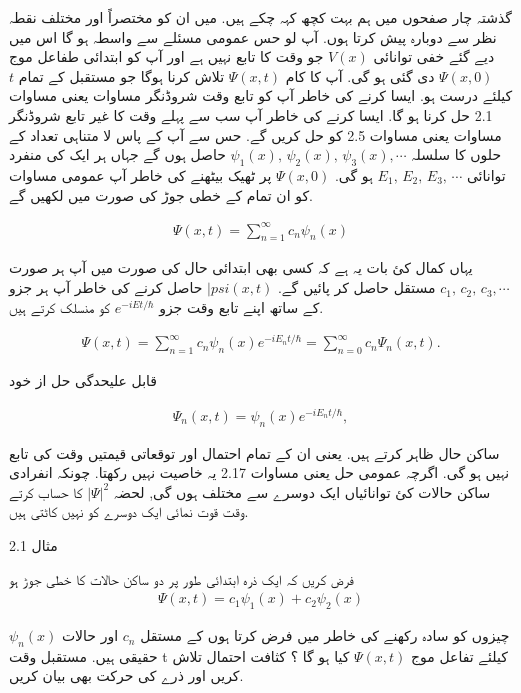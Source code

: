 گذشتہ چار صفحوں میں ہم بہت کچھ کہہ چکے ہیں. میں ان کو مختصراً اور مختلف نقطہ نظر سے دوبارہ پیش کرتا ہوں. آپ لو حس عمومی مسئلے سے واسطہ ہو گا اس میں دیے گئے خفی توانائی \( V(x) \) جو وقت کا تابع نہیں ہے اور آپ کو ابتدائی طفاعل موج \( \Psi (x,0) \) دی گئی ہو گی. آپ کا کام \( \Psi (x,t) \) تلاش کرنا ہوگا جو مستقبل کے تمام \( t \)  کیلئے درست ہو. ایسا کرنے کی خاطر آپ کو تابع وقت شروڈنگر مساوات یعنی مساوات 2.1 حل کرنا ہو گا. ایسا کرنے کی خاطر آپ سب سے پہلے وقت کا غیر تابع شروڈنگر مساوات یعنی مساوات 2.5 کو حل کریں گے. حس سے آپ کے پاس لا متناہی تعداد کے حلوں کا سلسلہ  \( \psi_{1}(x),\, \psi_{2}(x),\, \psi_{3}(x), \cdots \)  حاصل ہوں گے جہاں ہر ایک کی منفرد توانائی  \( E_{1}, \, E_{2}, \, E_{3}, \, \cdots \)  ہو گی. \( \Psi (x,0) \) پر ٹھیک بیٹھنے کی خاطر آپ عمومی مساوات کو ان تمام کے خطی جوڑ کی صورت میں لکھیں گے. 

\begin{align}
\Psi (x,t) = \sum_{n=1}^{\infty} c_{n} \psi_{n}(x)
\end{align}



یہاں کمال کئ بات یہ ہے کہ کسی بھی ابتدائی حال کی صورت میں آپ ہر صورت \( c_{1}, \,c_{2}, \,c_{3}, \cdots \) مستقل حاصل کر پائیں گے. \( |psi (x,t) \)  حاصل کرنے کی خاطر آپ ہر جزو کے ساتھ اپنے تابع وقت جزو \( e^{-iEt/\hbar} \) کو منسلک کرتے ہیں. 

\begin{align}
\Psi (x,t) = \sum_{n=1}^{\infty} c_{n} \psi_{n}(x)e^{-iE_{n}t/\hbar} = \sum_{n=0}^{\infty} c_{n} \Psi_{n} (x,t).
\end{align}

قابل علیحدگی حل از خود 

\begin{align}
\Psi_{n} (x,t) = \psi_{n}(x) e^{-iE_{n}t/\hbar},
\end{align}

ساکن حال ظاہر کرتے ہیں. یعنی ان کے تمام احتمال اور توقعاتی قیمتیں وقت کی تابع نہیں ہو گی. اگرچہ عمومی حل یعنی مساوات 2.17 یہ خاصیت نہیں رکھتا.
چونکہ انفرادی ساکن حالات کئ توانائیاں ایک دوسرے سے مختلف ہوں گی, لحضہ \( \left| \Psi \right|^{2} \) کا حساب کرتے وقت قوت نمائی ایک دوسرے کو نہیں کاٹتی ہیں. 


مثال 2.1 

فرض کریں کہ ایک ذرہ ابتدائی طور پر دو ساکن حالات کا خطی جوڑ ہو 
\begin{align}
\Psi (x,t) = c_{1} \psi_{1}(x) + c_{2} \psi_{2}(x) 
\end{align}


چیزوں کو سادہ رکھنے کی خاطر میں فرض کرتا ہوں کے مستقل \( c_{n} \) اور حالات \( \psi_{n} (x) \) حقیقی ہیں. مستقبل وقت t کیلئے تفاعل موج \( \Psi (x,t) \) کیا ہو گا ؟ کثافت احتمال تلاش کریں اور ذرے کی حرکت بھی بیان کریں. 

